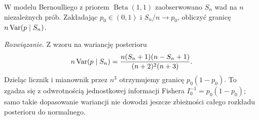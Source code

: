 \begin{zadanie}
W modelu Bernoulliego z priorem $\operatorname{Beta}(1,1)$
zaobserwowano $S_n$ wad na $n$ niezależnych prób.
Zakładając $p_0\in(0,1)$ i $S_n/n\to p_0$,
obliczyć granicę $n\operatorname{Var}(p\mid S_n)$.
\par\emph{Rozwiązanie.} Z wzoru na wariancję posterioru
\[
 n\operatorname{Var}(p\mid S_n)=
 \frac{n(S_n+1)(n-S_n+1)}{(n+2)^2(n+3)}.
\]
Dzieląc licznik i mianownik przez $n^3$ otrzymujemy
granicę $p_0(1-p_0)$.
To zgadza się z odwrotnością jednostkowej informacji
Fishera $I_0^{-1}=p_0(1-p_0)$; samo takie dopasowanie
wariancji nie dowodzi jeszcze zbieżności całego rozkładu
posterioru do normalnego.
\end{zadanie}

